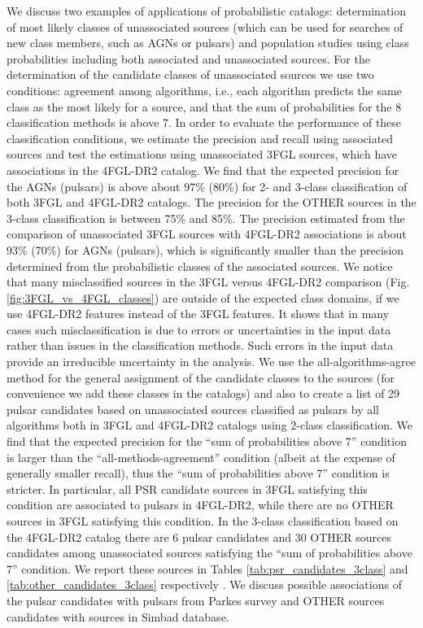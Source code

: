 We discuss two examples of applications of probabilistic catalogs: determination of most likely classes of unassociated sources (which can be used for searches of new class members, such as AGNs or pulsars) and population studies using class probabilities including both associated and unassociated sources.
For the determination of the candidate classes of unassociated sources we use two conditions: agreement among algorithms, i.e., each algorithm predicts the same class as the most likely for a source, and that the sum of probabilities for the 8 classification methods is above 7.
In order to evaluate the performance of these classification conditions, we estimate the precision and recall using associated sources and test the estimations using unassociated 3FGL sources, which have associations in the 4FGL-DR2 catalog.
We find that the expected precision for the AGNs (pulsars) is above about 97\% (80\%) for 2- and 3-class classification of both 3FGL and 4FGL-DR2 catalogs. The precision for the OTHER sources in the 3-class classification is between 75\% and 85\%.
The precision estimated from the comparison of unassociated 3FGL sources with 4FGL-DR2 associations is about 93\% (70\%) for AGNs (pulsars), which is significantly smaller than the precision determined from the probabilistic classes of the associated sources.
We notice that many misclassified sources in the 3FGL versus 4FGL-DR2 comparison (Fig. \ref{fig:3FGL_vs_4FGL_classes}) are outside of the expected class domains, if we use 4FGL-DR2 features instead of the 3FGL features. It shows that in many cases such misclassification is due to errors or uncertainties in the input data rather than issues in the classification methods. Such errors in the input data provide an irreducible uncertainty in the analysis. We use the all-algorithms-agree method for the general assignment of the candidate classes to the sources (for convenience we add these classes in the catalogs) and also to create a list of 29 pulsar candidates based on unassociated sources classified as pulsars by all algorithms both in 3FGL and 4FGL-DR2 catalogs using 2-class classification.
We find that the expected precision for the ``sum of probabilities above 7'' condition is larger than the ``all-methods-agreement'' condition (albeit at the expense of generally smaller recall), thus the ``sum of probabilities above 7'' condition is stricter.
In particular, all PSR candidate sources in 3FGL satisfying this condition are associated to pulsars in 4FGL-DR2, while there are no OTHER sources in 3FGL satisfying this condition. In the 3-class classification based on the 4FGL-DR2 catalog there are 6 pulsar candidates and 30 OTHER sources candidates among unassociated sources satisfying  the ``sum of probabilities above 7'' condition. 
We report these sources in Tables \ref{tab:psr_candidates_3class} and \ref{tab:other_candidates_3class} respectively \citep[digital versions of the tables are available in the supplementary online materials][]{SOM_material}. We discuss possible associations of the pulsar candidates with pulsars from Parkes survey \citep{Camilo2015} and OTHER sources candidates with sources in Simbad database.

